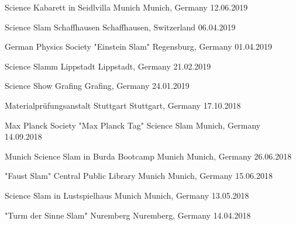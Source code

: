 \begin{cvhonors}
\cvhonor
{Science Kabarett in Seidlvilla Munich} %
{Munich, Germany} %
{} %
{12.06.2019} %

\cvhonor
{Science Slam Schaffhausen} %
{Schaffhausen, Switzerland} %
{} %
{06.04.2019} %

\cvhonor
{German Physics Society "Einstein Slam"} %
{Regensburg, Germany} %
{} %
{01.04.2019} %

\cvhonor
{Science Slamm Lippstadt} %
{Lippstadt, Germany} %
{} %
{21.02.2019} %

\cvhonor
{Science Show Grafing} %
{Grafing, Germany} %
{} %
{24.01.2019} %

\cvhonor
{Materialprüfungsanstalt Stuttgart} %
{Stuttgart, Germany} %
{} %
{17.10.2018} %

\cvhonor
{Max Planck Society "Max Planck Tag" Science Slam} %
{Munich, Germany} %
{} %
{14.09.2018} %

\cvhonor
{Munich Science Slam in Burda Bootcamp Munich} %
{Munich, Germany} %
{} %
{26.06.2018} %

\cvhonor
{"Faust Slam" Central Public Library Munich} %
{Munich, Germany} %
{} %
{15.06.2018} %

\cvhonor
{Science Slam in Lustspielhaus Munich} %
{Munich, Germany} %
{} %
{13.05.2018} %

\cvhonor
{"Turm der Sinne Slam" Nuremberg} %
{Nuremberg, Germany} %
{} %
{14.04.2018} %


\end{cvhonors}
